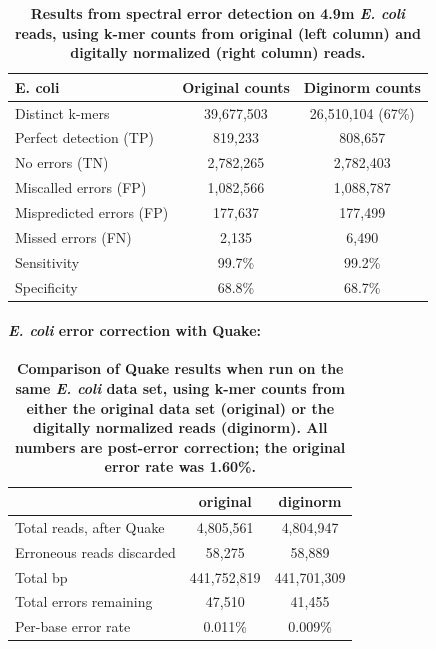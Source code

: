 \documentclass{article}
\begin{document}

\begin{table}
\centering
\begin{tabular}{|l|c|c|}
\hline
{\bf E. coli} & Original counts & Diginorm counts \\
\hline
Distinct k-mers         & 39,677,503 & 26,510,104 (67\%) \\
\hline
Perfect detection (TP)  & 819,233   & 808,657 \\
No errors (TN)          & 2,782,265 & 2,782,403 \\
Miscalled errors (FP)   & 1,082,566 & 1,088,787 \\
Mispredicted errors (FP)& 177,637       & 177,499   \\
Missed errors (FN)      & 2,135     & 6,490    \\
\hline
Sensitivity & 99.7\% & 99.2\% \\
Specificity & 68.8\% & 68.7\% \\
\hline
\end{tabular}


\caption{{\bf Results from spectral error detection on 4.9m {\em
      E. coli} reads, using k-mer counts from original (left column)
    and digitally normalized (right column) reads.}}

\label{tab:ecoli_dn_counts}
\end{table}

\paragraph{{\em E. coli} error correction with Quake:}


\begin{table}
\centering
\begin{tabular}{|l|c|c|}
\hline
                                 & original    & diginorm \\
\hline
Total reads, after Quake         & 4,805,561   & 4,804,947 \\
Erroneous reads discarded        & 58,275      & 58,889 \\
Total bp                         & 441,752,819 & 441,701,309 \\
Total errors remaining           & 47,510      & 41,455 \\
Per-base error rate              & 0.011\%     & 0.009\% \\
\hline
\end{tabular}

\caption{{\bf Comparison of Quake results when run on the same {\em
      E. coli} data set, using k-mer counts from either the original
    data set (original) or the digitally normalized reads
    (diginorm).  All numbers are post-error correction; the original
    error rate was 1.60\%.}}

\label{tab:quake_ecoli}
\end{table}
\end{document}
